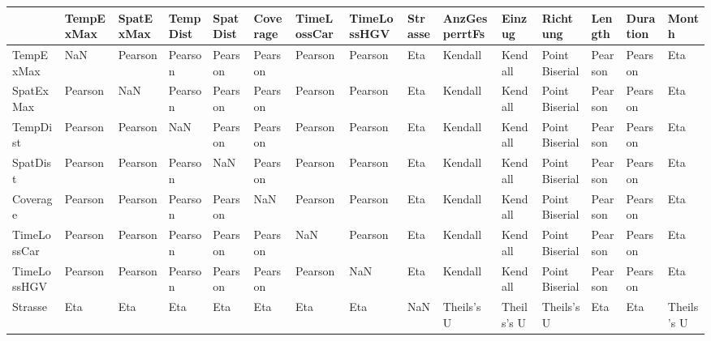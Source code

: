 \begin{tabular}{lllllllllllllll}
\toprule
{} &       TempExMax &       SpatExMax &        TempDist &        SpatDist &        Coverage &     TimeLossCar &     TimeLossHGV &     Strasse & AnzGesperrtFs &      Einzug &        Richtung &          Length &        Duration &       Month \\
\midrule
TempExMax     &             NaN &         Pearson &         Pearson &         Pearson &         Pearson &         Pearson &         Pearson &         Eta &       Kendall &     Kendall &  Point Biserial &         Pearson &         Pearson &         Eta \\
SpatExMax     &         Pearson &             NaN &         Pearson &         Pearson &         Pearson &         Pearson &         Pearson &         Eta &       Kendall &     Kendall &  Point Biserial &         Pearson &         Pearson &         Eta \\
TempDist      &         Pearson &         Pearson &             NaN &         Pearson &         Pearson &         Pearson &         Pearson &         Eta &       Kendall &     Kendall &  Point Biserial &         Pearson &         Pearson &         Eta \\
SpatDist      &         Pearson &         Pearson &         Pearson &             NaN &         Pearson &         Pearson &         Pearson &         Eta &       Kendall &     Kendall &  Point Biserial &         Pearson &         Pearson &         Eta \\
Coverage      &         Pearson &         Pearson &         Pearson &         Pearson &             NaN &         Pearson &         Pearson &         Eta &       Kendall &     Kendall &  Point Biserial &         Pearson &         Pearson &         Eta \\
TimeLossCar   &         Pearson &         Pearson &         Pearson &         Pearson &         Pearson &             NaN &         Pearson &         Eta &       Kendall &     Kendall &  Point Biserial &         Pearson &         Pearson &         Eta \\
TimeLossHGV   &         Pearson &         Pearson &         Pearson &         Pearson &         Pearson &         Pearson &             NaN &         Eta &       Kendall &     Kendall &  Point Biserial &         Pearson &         Pearson &         Eta \\
Strasse       &             Eta &             Eta &             Eta &             Eta &             Eta &             Eta &             Eta &         NaN &    Theils's U &  Theils's U &      Theils's U &             Eta &             Eta &  Theils's U \\

\end{tabular}
